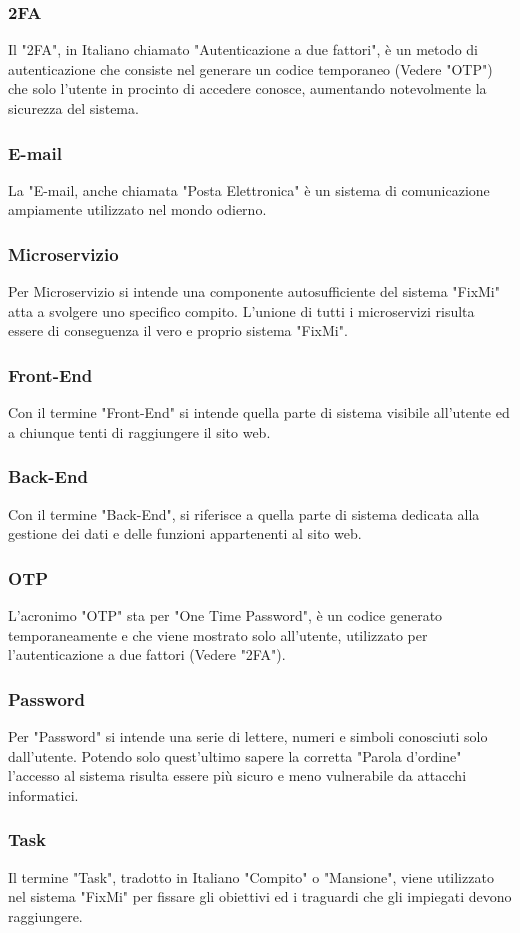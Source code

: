 \documentclass{report}
\begin{document}
\subsubsection*{2FA}
Il "2FA", in Italiano chiamato "Autenticazione a due fattori", è un metodo di autenticazione che consiste nel generare un codice temporaneo (Vedere "OTP") che solo l'utente in procinto di accedere conosce, aumentando notevolmente la sicurezza del sistema.
\subsubsection*{E-mail}
La "E-mail, anche chiamata "Posta Elettronica" è un sistema di comunicazione ampiamente utilizzato nel mondo odierno.
\subsubsection*{Microservizio}
Per Microservizio si intende una componente autosufficiente del sistema "FixMi" atta a svolgere uno specifico compito. L'unione di tutti i microservizi risulta essere di conseguenza il vero e proprio sistema "FixMi".
\subsubsection*{Front-End}
Con il termine "Front-End" si intende quella parte di sistema visibile all'utente ed a chiunque tenti di raggiungere il sito web.
\subsubsection*{Back-End}
Con il termine "Back-End", si riferisce a quella parte di sistema dedicata alla gestione dei dati e delle funzioni appartenenti al sito web.
\subsubsection*{OTP}
L'acronimo "OTP" sta per "One Time Password", è un codice generato temporaneamente e che viene mostrato solo all'utente, utilizzato per l'autenticazione a due fattori (Vedere "2FA").
\subsubsection*{Password}
Per "Password" si intende una serie di lettere, numeri e simboli conosciuti solo dall'utente. Potendo solo quest'ultimo sapere la corretta "Parola d'ordine" l'accesso al sistema risulta essere più sicuro e meno vulnerabile da attacchi informatici.
\subsubsection*{Task}
Il termine "Task", tradotto in Italiano "Compito" o "Mansione", viene utilizzato nel sistema "FixMi" per fissare gli obiettivi ed i traguardi che gli impiegati devono raggiungere.
\end{document}

